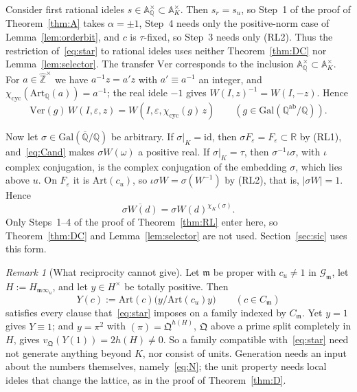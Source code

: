 \documentclass[11pt]{amsart}
\numberwithin{equation}{section}
\theoremstyle{plain}
\theoremstyle{definition}
\theoremstyle{remark}
\newtheorem{remark}[theorem]{Remark}
\begin{document}
Consider first rational ideles \(s\in\mathbb A_{\mathbb Q}^\times\subset\mathbb A_K^\times\). Then \(s_r=s_u\), so Step~1 of the proof of Theorem~\ref{thm:A} takes \(\alpha=\pm1\), Step~4 needs only the positive-norm case of Lemma~\ref{lem:orderbit}, and \(c\) is \(\tau\)-fixed, so Step~3 needs only (RL2). Thus the restriction of~\eqref{eq:star} to rational ideles uses neither Theorem~\ref{thm:DC} nor Lemma~\ref{lem:selector}. The transfer \(\mathrm{Ver}\) corresponds to the inclusion \(\mathbb A_{\mathbb Q}^\times\subset\mathbb A_K^\times\). For \(a\in\widehat{\mathbb Z}^\times\) we have \(a^{-1}z=a'z\) with \(a'\equiv a^{-1}\) an integer, and \(\chi_{\mathrm{cyc}}(\mathrm{Art}_{\mathbb Q}(a))=a^{-1}\); the real idele \(-1\) gives \(W(I,z)^{-1}=W(I,-z)\). Hence
\[\mathrm{Ver}(g)\,W(I,\varepsilon,z)=W(I,\varepsilon,\chi_{\mathrm{cyc}}(g)\,z)\qquad(g\in\mathrm{Gal}(\mathbb Q^{\mathrm{ab}}/\mathbb Q)).\]

Now let \(\sigma\in\mathrm{Gal}(\overline{\mathbb Q}/\mathbb Q)\) be arbitrary. If \(\sigma|_K=\mathrm{id}\), then \(\sigma F_\varepsilon=F_\varepsilon\subset\mathbb R\) by (RL1), and~\eqref{eq:Cand} makes \(\sigma W(\omega)\) a positive real. If \(\sigma|_K=\tau\), then \(\sigma^{-1}\iota\sigma\), with \(\iota\) complex conjugation, is the complex conjugation of the embedding \(\sigma\), which lies above \(u\). On \(F_\varepsilon\) it is \(\mathrm{Art}(c_u)\), so \(\iota\sigma W=\sigma(W^{-1})\) by (RL2), that is, \(|\sigma W|=1\). Hence
\[\overline{\sigma W(d)}=\sigma W(d)^{\chi_K(\sigma)}.\]
Only Steps~1--4 of the proof of Theorem~\ref{thm:RL} enter here, so Theorem~\ref{thm:DC} and Lemma~\ref{lem:selector} are not used. Section~\ref{sec:sic} uses this form.

\begin{remark}[What reciprocity cannot give]\label{rem:recnogo}
Let \(\mathfrak m\) be proper with \(c_u\ne1\) in \(\mathcal G_{\mathfrak m}\), let \(H:=H_{\mathfrak m\infty_u}\), and let \(y\in H^\times\) be totally positive. Then
\[Y(c):=\mathrm{Art}(c)\bigl(y/\mathrm{Art}(c_u)y\bigr)\qquad(c\in C_{\mathfrak m})\]
satisfies every clause that~\eqref{eq:star} imposes on a family indexed by \(C_{\mathfrak m}\). Yet \(y=1\) gives \(Y\equiv1\); and \(y=\pi^2\) with \((\pi)=\mathfrak Q^{h(H)}\), \(\mathfrak Q\) above a prime split completely in \(H\), gives \(v_{\mathfrak Q}(Y(1))=2h(H)\ne0\). So a family compatible with~\eqref{eq:star} need not generate anything beyond \(K\), nor consist of units. Generation needs an input about the numbers themselves, namely~\eqref{eq:N}; the unit property needs local ideles that change the lattice, as in the proof of Theorem~\ref{thm:D}.
\end{remark}
\end{document}
